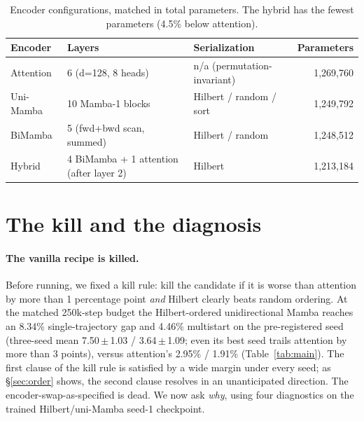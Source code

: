 \documentclass[11pt]{article}
\newcommand{\headrow}{\rowcolor{headtint}}
\newcommand{\pct}{\%}
\begin{document}
\begin{table}[t]
\centering
\caption{Encoder configurations, matched in total parameters. The hybrid has the
fewest parameters (4.5\pct{} below attention).}
\label{tab:params}
\small
\setlength{\tabcolsep}{5pt}
\begin{tabular}{lll r}
\toprule
\headrow
Encoder & Layers & Serialization & Parameters \\
\midrule
Attention        & 6 (d=128, 8 heads)                       & n/a (permutation-invariant) & 1{,}269{,}760 \\
Uni-Mamba        & 10 Mamba-1 blocks                        & Hilbert / random / sort & 1{,}249{,}792 \\
BiMamba          & 5 (fwd+bwd scan, summed)                 & Hilbert / random & 1{,}248{,}512 \\
Hybrid           & 4 BiMamba + 1 attention (after layer 2)  & Hilbert & 1{,}213{,}184 \\
\bottomrule
\end{tabular}
\end{table}

\section{The kill and the diagnosis}
\label{sec:kill}

\paragraph{The vanilla recipe is killed.}
Before running, we fixed a kill rule: kill the candidate if it is worse than
attention by more than 1 percentage point \emph{and} Hilbert clearly beats
random ordering. At the matched 250k-step budget the Hilbert-ordered
unidirectional Mamba reaches an 8.34\pct{} single-trajectory gap and 4.46\pct{}
multistart on the pre-registered seed (three-seed mean 7.50\,$\pm$\,1.03 /
3.64\,$\pm$\,1.09; even its best seed trails attention by more than 3 points),
versus attention's 2.95\pct{} / 1.91\pct{} (Table~\ref{tab:main}). The first
clause of the kill rule is satisfied by a wide margin under every seed; as
\S\ref{sec:order} shows, the second clause resolves in an unanticipated
direction. The encoder-swap-as-specified is dead. We now ask
\emph{why}, using four diagnostics on the trained Hilbert/uni-Mamba seed-1
checkpoint.
\end{document}
